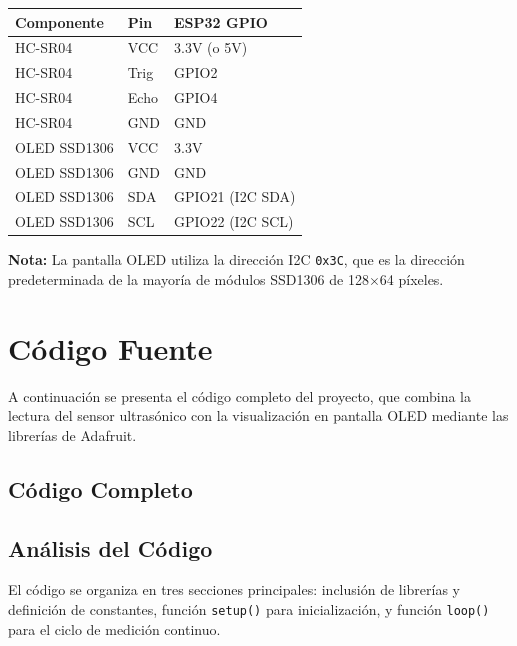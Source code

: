 \documentclass[12pt,a4paper]{article}
\begin{document}
\begin{center}
\begin{tabular}{lll}
\toprule
\textbf{Componente} & \textbf{Pin} & \textbf{ESP32 GPIO} \\
\midrule
HC-SR04 & VCC & 3.3V (o 5V) \\
HC-SR04 & Trig & GPIO2 \\
HC-SR04 & Echo & GPIO4 \\
HC-SR04 & GND & GND \\
\midrule
OLED SSD1306 & VCC & 3.3V \\
OLED SSD1306 & GND & GND \\
OLED SSD1306 & SDA & GPIO21 (I2C SDA) \\
OLED SSD1306 & SCL & GPIO22 (I2C SCL) \\
\bottomrule
\end{tabular}
\end{center}

\textbf{Nota:} La pantalla OLED utiliza la dirección I2C \texttt{0x3C}, que es la dirección predeterminada de la mayoría de módulos SSD1306 de 128$\times$64 píxeles.

\section{Código Fuente}

A continuación se presenta el código completo del proyecto, que combina la lectura del sensor ultrasónico con la visualización en pantalla OLED mediante las librerías de Adafruit.

\subsection{Código Completo}


\subsection{Análisis del Código}

El código se organiza en tres secciones principales: inclusión de librerías y definición de constantes, función \texttt{setup()} para inicialización, y función \texttt{loop()} para el ciclo de medición continuo.
\end{document}
